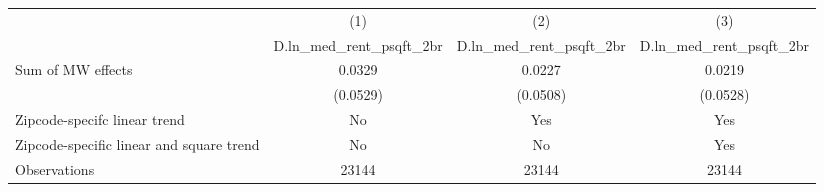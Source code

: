{
\def\sym#1{\ifmmode^{#1}\else\(^{#1}\)\fi}
\begin{tabular}{l*{3}{c}}
\hline\hline
          &\multicolumn{1}{c}{(1)}&\multicolumn{1}{c}{(2)}&\multicolumn{1}{c}{(3)}\\
          &\multicolumn{1}{c}{D.ln\_med\_rent\_psqft\_2br}&\multicolumn{1}{c}{D.ln\_med\_rent\_psqft\_2br}&\multicolumn{1}{c}{D.ln\_med\_rent\_psqft\_2br}\\
\hline
Sum of MW effects&   0.0329         &   0.0227         &   0.0219         \\
          & (0.0529)         & (0.0508)         & (0.0528)         \\
\hline
Zipcode-specifc linear trend&       No         &      Yes         &      Yes         \\
Zipcode-specific linear and square trend&       No         &       No         &      Yes         \\
Observations&    23144         &    23144         &    23144         \\
\hline\hline
\end{tabular}
}
